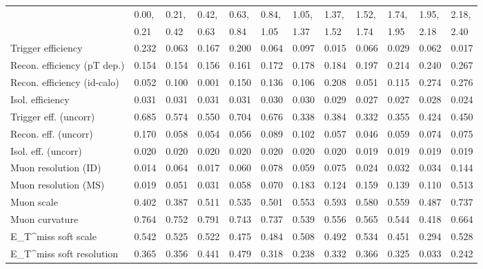 \begin{tabular}{l|p{0.6cm}p{0.6cm}p{0.6cm}p{0.6cm}p{0.6cm}p{0.6cm}p{0.6cm}p{0.6cm}p{0.6cm}p{0.6cm}p{0.6cm}}
\hline
   & 0.00, & 0.21, & 0.42, & 0.63, & 0.84, & 1.05, & 1.37, & 1.52, & 1.74, & 1.95, & 2.18,  \\ 
   & 0.21 & 0.42 & 0.63 & 0.84 & 1.05 & 1.37 & 1.52 & 1.74 & 1.95 & 2.18 & 2.40  \\ 
\hline
Trigger efficiency                       & 0.232 & 0.063 & 0.167 & 0.200 & 0.064 & 0.097 & 0.015 & 0.066 & 0.029 & 0.062 & 0.017 \\
Recon. efficiency (pT dep.)              & 0.154 & 0.154 & 0.156 & 0.161 & 0.172 & 0.178 & 0.184 & 0.197 & 0.214 & 0.240 & 0.267 \\
Recon. efficiency (id-calo)              & 0.052 & 0.100 & 0.001 & 0.150 & 0.136 & 0.106 & 0.208 & 0.051 & 0.115 & 0.274 & 0.276 \\
Isol. efficiency                         & 0.031 & 0.031 & 0.031 & 0.031 & 0.030 & 0.030 & 0.029 & 0.027 & 0.027 & 0.028 & 0.024 \\
Trigger eff. (uncorr)                    & 0.685 & 0.574 & 0.550 & 0.704 & 0.676 & 0.338 & 0.384 & 0.332 & 0.355 & 0.424 & 0.450 \\
Recon. eff. (uncorr)                     & 0.170 & 0.058 & 0.054 & 0.056 & 0.089 & 0.102 & 0.057 & 0.046 & 0.059 & 0.074 & 0.075 \\
Isol. eff. (uncorr)                      & 0.020 & 0.020 & 0.020 & 0.020 & 0.020 & 0.020 & 0.020 & 0.019 & 0.019 & 0.019 & 0.019 \\
Muon resolution (ID)                     & 0.014 & 0.064 & 0.017 & 0.060 & 0.078 & 0.059 & 0.075 & 0.024 & 0.032 & 0.034 & 0.144 \\
Muon resolution (MS)                     & 0.019 & 0.051 & 0.031 & 0.058 & 0.070 & 0.183 & 0.124 & 0.159 & 0.139 & 0.110 & 0.513 \\
Muon scale                               & 0.402 & 0.387 & 0.511 & 0.535 & 0.501 & 0.553 & 0.593 & 0.580 & 0.559 & 0.487 & 0.737 \\
Muon curvature                           & 0.764 & 0.752 & 0.791 & 0.743 & 0.737 & 0.539 & 0.556 & 0.565 & 0.544 & 0.418 & 0.664 \\
E_{T}^{miss} soft scale                  & 0.542 & 0.525 & 0.522 & 0.475 & 0.484 & 0.508 & 0.492 & 0.534 & 0.451 & 0.294 & 0.528 \\
E_{T}^{miss} soft resolution             & 0.365 & 0.356 & 0.441 & 0.479 & 0.318 & 0.238 & 0.332 & 0.366 & 0.325 & 0.033 & 0.242 \\

\end{tabular}
